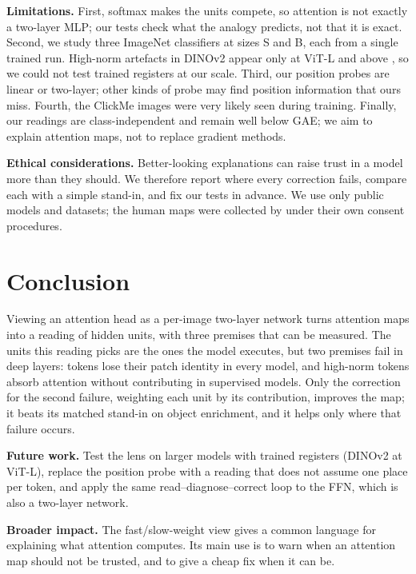 \documentclass{article}
\begin{document}
\textbf{Limitations.} First, softmax makes the units compete, so attention is not exactly a two-layer MLP; our tests check what the analogy predicts, not that it is exact. Second, we study three ImageNet classifiers at sizes S and B, each from a single trained run. High-norm artefacts in DINOv2 appear only at ViT-L and above \citep{darcet2024}, so we could not test trained registers at our scale. Third, our position probes are linear or two-layer; other kinds of probe may find position information that ours miss. Fourth, the ClickMe images were very likely seen during training. Finally, our readings are class-independent and remain well below GAE; we aim to explain attention maps, not to replace gradient methods.

\textbf{Ethical considerations.} Better-looking explanations can raise trust in a model more than they should. We therefore report where every correction fails, compare each with a simple stand-in, and fix our tests in advance. We use only public models and datasets; the human maps were collected by \citet{linsley2019} under their own consent procedures.

\section{Conclusion}

Viewing an attention head as a per-image two-layer network turns attention maps into a reading of hidden units, with three premises that can be measured. The units this reading picks are the ones the model executes, but two premises fail in deep layers: tokens lose their patch identity in every model, and high-norm tokens absorb attention without contributing in supervised models. Only the correction for the second failure, weighting each unit by its contribution, improves the map; it beats its matched stand-in on object enrichment, and it helps only where that failure occurs.

\textbf{Future work.} Test the lens on larger models with trained registers (DINOv2 at ViT-L), replace the position probe with a reading that does not assume one place per token, and apply the same read--diagnose--correct loop to the FFN, which is also a two-layer network.

\textbf{Broader impact.} The fast/slow-weight view gives a common language for explaining what attention computes. Its main use is to warn when an attention map should not be trusted, and to give a cheap fix when it can be.




\FloatBarrier
\clearpage

\FloatBarrier
\end{document}
